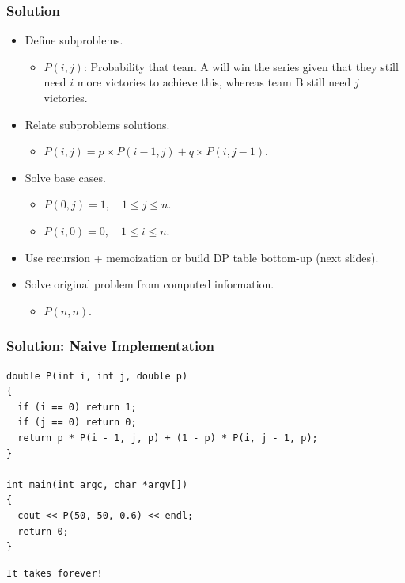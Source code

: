 \documentclass{beamer}
\begin{document}
\begin{frame}%
\frametitle{Solution}

\begin{itemize}

\item Define subproblems.
\begin{itemize}
\item $P(i, j)$: Probability that team A will win the series given that they still
need $i$ more victories to achieve this, whereas team B still need $j$ victories.
\end{itemize}

\vspace{0.3cm}

\item<2-> Relate subproblems solutions.
\begin{itemize}
\item $P(i, j) = p\times P(i-1, j) + q\times P(i, j-1)$.
\end{itemize}
\vspace{0.3cm}

\item<3-> Solve base cases.
\begin{itemize}
\item $P(0, j) = 1,\quad 1 \le j \le n$.
\item $P(i, 0) = 0,\quad 1 \le i \le n$.
\end{itemize}

\vspace{0.3cm}

\item<4-> Use recursion + memoization or build DP table bottom-up (next slides).

\vspace{0.3cm}

\item<5-> Solve original problem from computed information.
\begin{itemize}
\item $P(n, n)$.
\end{itemize}

\end{itemize}

\end{frame}

\begin{frame}[containsverbatim]
\frametitle{Solution: Naive Implementation}

\scriptsize
\begin{lstlisting}
double P(int i, int j, double p)
{
  if (i == 0) return 1;
  if (j == 0) return 0;
  return p * P(i - 1, j, p) + (1 - p) * P(i, j - 1, p);
}

int main(int argc, char *argv[])
{
  cout << P(50, 50, 0.6) << endl;
  return 0;
}
\end{lstlisting}

\begin{verbatim}
It takes forever!
\end{verbatim}

\end{frame}
\end{document}

